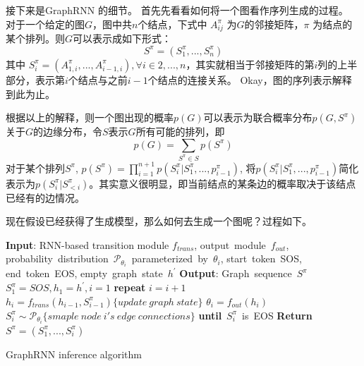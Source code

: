 \par 接下来是GraphRNN 的细节。
首先先看看如何将一个图看作序列生成的过程。
对于一个给定的图$G$，图中共$n$个结点，下式中 $A^{\pi}_{ij}$ 为$G$的邻接矩阵，$\pi$ 为结点的某个排列。则$G$可以表示成如下形式： 
$$
S^\pi = (S^{\pi}_1,...,S^{\pi}_n)
$$
其中 $S^{\pi}_i = (A^{\pi}_{1,i},..., A^{\pi}_{i-1,i}), \forall i \in {2,...,n} $，其实就相当于邻接矩阵的第$i$列的上半部分，表示第$i$个结点与之前$i-1$个结点的连接关系。
Okay，图的序列表示解释到此为止。

\par 根据以上的解释，则一个图出现的概率$p(G)$可以表示为联合概率分布$p(G, S^{\pi})$ 关于$G$的边缘分布，令$S$表示$G$所有可能的排列，即
$$
p(G) = \sum_{S^{\pi} \in S } p(S^{\pi}) 
$$
对于某个排列$S^{\pi}$, $p(S^{\pi}) = \prod_{i=1}^{n+1} p(S^{\pi}_i | S^{\pi}_1,...,p^{\pi}_{i-1})$, 将$p(S^{\pi}_i | S^{\pi}_1,...,p^{\pi}_{i-1})$简化表示为$p(S^{\pi}_i | S^{\pi}_{<i})$。其实意义很明显，即当前结点的某条边的概率取决于该结点已经有的边情况。

\par 现在假设已经获得了生成模型，那么如何去生成一个图呢？过程如下。
\begin{algorithm}[H]
    \begin{algorithmic}[1]
        \textbf{Input}: RNN-based transition module $f_{trans}$, output\ module\ $f_{out}$, \newline
        probability\ distribution\ $\mathcal{P}_{\theta_{i}}$\ parameterized\ by\ $\theta_{i}$, start\ token\ SOS, end\ token\  EOS, empty\ graph\ state\ $h^{'}$ \newline
        \textbf{Output}: Graph\ sequence\ $S^{\pi}$
        $S^{\pi}_1=SOS, h_1=h^{'}, i=1$ \newline
        \textbf{repeat} \newline
            $i = i+1$ \newline
            $h_i = f_{trans}(h_{i-1}, S^{\pi}_{i-1})\{update\ graph\ state\}$\newline
            $\theta_i = f_{out}(h_i)$ \newline
            $S^{\pi}_{i} \sim \mathcal{P}_{\theta_i}\{smaple\ node\ i's\ edge\ connections\}$ \newline
        \textbf{until}\ $S^{\pi}_i$\ is\ EOS \newline
        \textbf{Return}\ $S^{\pi} = (S^{\pi}_1,...,S^{\pi}_i)$ \newline
    \end{algorithmic}
    \caption{GraphRNN inference algorithm }
\end{algorithm}

